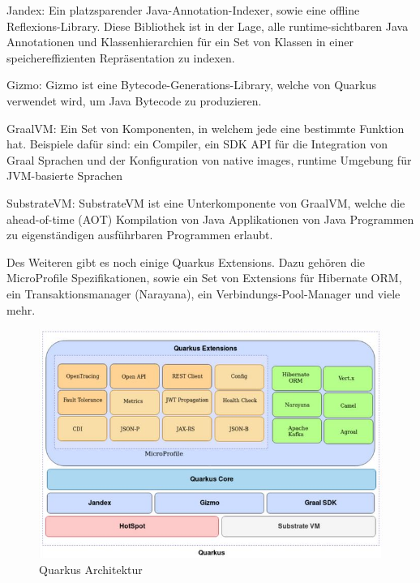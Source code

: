 \begin{compactitem}
    \item Jandex: Ein platzsparender Java-Annotation-Indexer, sowie eine offline Reflexions-Library. Diese Bibliothek ist in der Lage, alle runtime-sichtbaren Java Annotationen und Klassenhierarchien für ein Set von Klassen in einer speichereffizienten Repräsentation zu indexen.    
    \item Gizmo: Gizmo ist eine Bytecode-Generations-Library, welche von Quarkus verwendet wird, um Java Bytecode zu produzieren.             
    \item GraalVM: Ein Set von Komponenten, in welchem jede eine bestimmte Funktion hat. Beispiele dafür sind: ein Compiler, ein SDK API für die Integration von Graal Sprachen und der Konfiguration von native images, runtime Umgebung für JVM-basierte Sprachen
    \item SubstrateVM: SubstrateVM ist eine Unterkomponente von GraalVM, welche die ahead-of-time (AOT) Kompilation von Java Applikationen von Java Programmen zu eigenständigen ausführbaren Programmen erlaubt.
\end{compactitem}
 
Des Weiteren gibt es noch einige Quarkus Extensions. Dazu gehören die MicroProfile Spezifikationen, sowie ein Set von Extensions für Hibernate ORM, ein Transaktionsmanager (Narayana), ein Verbindungs-Pool-Manager und viele mehr. \cite{QuarkusBuch}
 
\begin{figure}
    \centering
    \includegraphics[scale=0.9]{pics/quarkusArchitektur.JPG}
    \caption{Quarkus Architektur \cite{QuarkusBuch}}
    \label{fig:impl:QuarkusArchitektur}
\end{figure}
 
